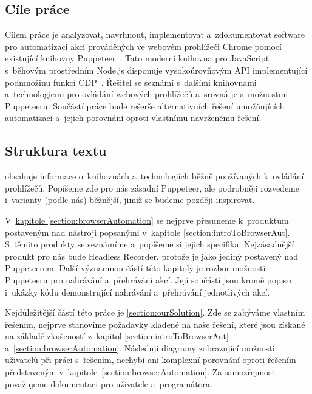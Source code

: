 \documentclass[12pt, a4paper, twoside]{article}
\begin{document}
	\subsection{Cíle práce}
	Cílem práce je analyzovat, navrhnout, implementovat a~zdokumentovat software pro automatizaci akcí prováděných ve webovém prohlížeči Chrome pomocí existující knihovny Puppeteer~\cite{puppeteerApi}.
	Tato moderní knihovna pro JavaScript s~běhovým prostředním Node.js disponuje vysokoúrovňovým API implementující podmnožinu funkcí CDP~\cite{devtoolsProtocol}.
	Řešitel se seznámí s~dalšími knihovnami a~technologiemi pro ovládání webových prohlížečů a~srovná je s~možnostmi Puppeteeru.
	Součástí práce bude rešerše alternativních řešení umožňujících automatizaci a~jejich porovnání oproti vlastnímu navrženému řešení.
	\subsection{Struktura textu}
	 obsahuje informace o~knihovnách a~technologiích běžně používaných k~ovládání prohlížečů. Popíšeme zde pro nás zásadní Puppeteer, ale podrobněji rozvedeme i~varianty (podle nás) běžnější, jimiž se budeme později inspirovat.
	
	V~\hyperref[section:browserAutomation]{kapitole \ref{section:browserAutomation}} se nejprve přesuneme k~produktům postaveným nad nástroji popsanými v~\hyperref[section:introToBrowserAut]{kapitole \ref{section:introToBrowserAut}}. S~těmito produkty se seznámíme a~popíšeme si jejich specifika. Nejzásadnější produkt pro nás bude Headless Recorder, protože je jako jediný postavený nad Puppeteerem. Další významnou částí této kapitoly je rozbor možností Puppeteeru pro nahrávání a~přehrávání akcí. Její součástí jsou kromě popisu i~ukázky kódu demonstrující nahrávání a~přehrávání jednotlivých akcí.
	
	Nejdůležitější částí této práce je \cref{section:ourSolution}. Zde se zabýváme vlastním řešením, nejprve stanovíme požadavky kladené na naše řešení, které jsou získané na základě zkušeností z~kapitol \ref{section:introToBrowserAut} a~\ref{section:browserAutomation}. Následují diagramy zobrazující možnosti uživatelů při práci s~řešením, nechybí ani komplexní porovnání oproti řešením představeným v~\hyperref[section:browserAutomation]{kapitole~\ref{section:browserAutomation}}. Za samozřejmost považujeme dokumentaci pro uživatele a~programátora.
\end{document}
